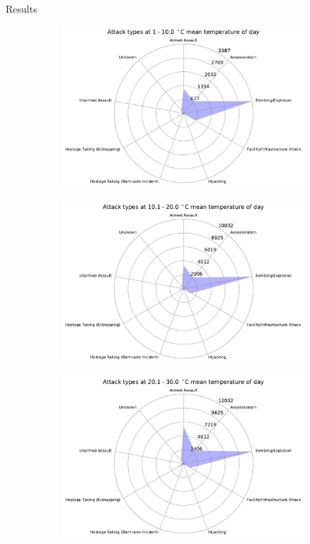 \documentclass{beamer}
\begin{document}
\begin{frame}{Results}
\begin{figure}
\begin{subfigure}[b]{0.3\textwidth}
		\end{subfigure}
		\begin{subfigure}[b]{0.3\textwidth}
			\includegraphics[width=\textwidth]{Temp-Attack/temp1-100_starDiagram}
		\end{subfigure}
	\end{figure}
	\begin{figure}
		\begin{subfigure}[b]{0.3\textwidth}
			\includegraphics[width=\textwidth]{Temp-Attack/temp101-200_starDiagram}
		\end{subfigure}
		\begin{subfigure}[b]{0.3\textwidth}
			\includegraphics[width=\textwidth]{Temp-Attack/temp201-300_starDiagram}

\end{subfigure}
\end{figure}
\end{frame}
\end{document}
